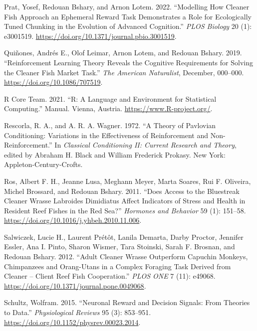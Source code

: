 \documentclass[
  12pt,
]{article}
\newlength{\cslhangindent}
\newlength{\cslentryspacingunit} %
\newenvironment{CSLReferences}[2] %
 {%
  \setlength{\parindent}{0pt}
  \ifodd #1
  \let\oldpar\par
  \def\par{\hangindent=\cslhangindent\oldpar}
  \fi
  \setlength{\parskip}{#2\cslentryspacingunit}
 }%
 {}
\begin{document}
\begin{CSLReferences}{1}{0}
\leavevmode{}%
Prat, Yosef, Redouan Bshary, and Arnon Lotem. 2022. {``Modelling How
Cleaner Fish Approach an Ephemeral Reward Task Demonstrates a Role for
Ecologically Tuned Chunking in the Evolution of Advanced Cognition.''}
\emph{PLOS Biology} 20 (1): e3001519.
\url{https://doi.org/10.1371/journal.pbio.3001519}.

\leavevmode{}%
Quiñones, Andrés E., Olof Leimar, Arnon Lotem, and Redouan Bshary. 2019.
{``Reinforcement {Learning} {Theory} {Reveals} the {Cognitive}
{Requirements} for {Solving} the {Cleaner} {Fish} {Market} {Task}.''}
\emph{The American Naturalist}, December, 000--000.
\url{https://doi.org/10.1086/707519}.

\leavevmode{}%
R Core Team. 2021. {``R: {A} Language and Environment for Statistical
Computing.''} Manual. Vienna, Austria. \url{https://www.R-project.org/}.

\leavevmode{}%
Rescorla, R. A., and A. R. A. Wagner. 1972. {``A Theory of {Pavlovian}
Conditioning: Variations in the Effectiveness of Reinforcement and
Non-Reinforcement.''} In \emph{Classical Conditioning {II}: Current
Research and Theory}, edited by Abraham H. Black and William Frederick
Prokasy. New York: Appleton-Century-Crofts.

\leavevmode{}%
Ros, Albert F. H., Jeanne Lusa, Meghann Meyer, Marta Soares, Rui F.
Oliveira, Michel Brossard, and Redouan Bshary. 2011. {``Does Access to
the Bluestreak Cleaner Wrasse {Labroides} Dimidiatus Affect Indicators
of Stress and Health in Resident Reef Fishes in the {Red} {Sea}?''}
\emph{Hormones and Behavior} 59 (1): 151--58.
\url{https://doi.org/10.1016/j.yhbeh.2010.11.006}.

\leavevmode{}%
Salwiczek, Lucie H., Laurent Prétôt, Lanila Demarta, Darby Proctor,
Jennifer Essler, Ana I. Pinto, Sharon Wismer, Tara Stoinski, Sarah F.
Brosnan, and Redouan Bshary. 2012. {``Adult {Cleaner} {Wrasse}
{Outperform} {Capuchin} {Monkeys}, {Chimpanzees} and {Orang}-Utans in a
{Complex} {Foraging} {Task} {Derived} from {Cleaner} -- {Client} {Reef}
{Fish} {Cooperation}.''} \emph{PLOS ONE} 7 (11): e49068.
\url{https://doi.org/10.1371/journal.pone.0049068}.

\leavevmode{}%
Schultz, Wolfram. 2015. {``Neuronal {Reward} and {Decision} {Signals}:
{From} {Theories} to {Data}.''} \emph{Physiological Reviews} 95 (3):
853--951. \url{https://doi.org/10.1152/physrev.00023.2014}.


\end{CSLReferences}
\end{document}

